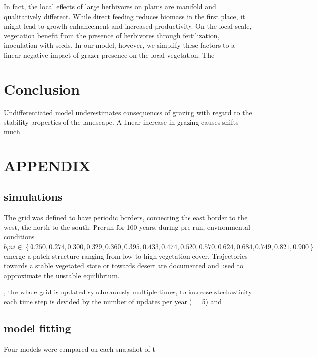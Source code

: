 In fact, the local effects of large herbivores on plants are manifold and qualitatively different. While direct feeding reduces biomass in the first place, it might lead to growth enhancement and increased productivity. On the local scale, vegetation benefit from the presence of herbivores through fertilization, inoculation with seeds, 
In our model, however, we simplify these factors to a linear negative impact of grazer presence on the local vegetation. The  

\section{Conclusion}
Undifferentiated model underestimates consequences of grazing with regard to the stability properties of the landscape. 
A linear increase in grazing causes shifts much  

\section{APPENDIX}

\subsection{simulations}

The grid was defined to have periodic borders, connecting the east border to the west, the north to the south.
Prerun for 100 years. 
during pre-run, environmental conditions $b_ini \in \left\{ 0.250, 0.274, 0.300, 0.329, 0.360, 0.395, 0.433, 0.474, 0.520, 0.570, 0.624, 0.684, 0.749, 0.821, 0.900 \right\} $ emerge a patch structure ranging from low to high vegetation cover. Trajectories towards a stable vegetated state or towards desert are documented and used to approximate the unstable equilibrium.

, the whole grid is updated synchronously multiple times, to increase stochasticity
each time step is devided by the number of updates per year ( = 5) and

\subsection{model fitting}
 Four models were compared on each snapshot of t



